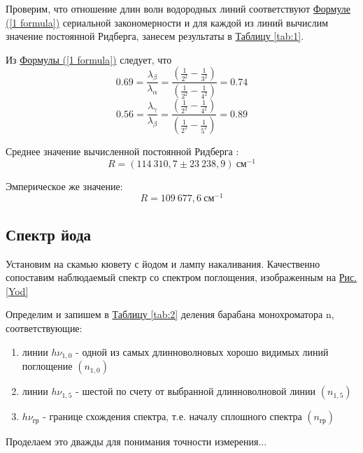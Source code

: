 \documentclass{article}
\begin{document}
Проверим, что отношение длин волн водородных линий соответствуют \hyperref[1 formula]{Формуле (\ref*{1 formula})} сериальной закономерности  и для каждой из линий вычислим значение постоянной Ридберга, занесем результаты в  \hyperref[tab:1]{Таблицу \ref*{tab:1}}.

Из  \hyperref[1 formula]{Формулы (\ref*{1 formula})} следует, что 
\begin{equation*}     
\label{}
0.69 = \frac{\lambda_{\beta}}{\lambda_{\alpha}} =  \frac{\left(\frac{1}{2^2} - \frac{1}{3^2} \right)}{\left(\frac{1}{2^2} - \frac{1}{4^2} \right)} = 0.74
\end{equation*}
\begin{equation*}     
\label{}
0.56 = \frac{\lambda_{\gamma}}{\lambda_{\beta}} =  \frac{\left(\frac{1}{2^2} - \frac{1}{4^2} \right)}{\left(\frac{1}{2^2} - \frac{1}{5^2} \right)} = 0.89
\end{equation*}

 Среднее значение вычисленной постоянной Ридберга :
 \begin{equation}
 \label{R}
     R = (114~310,7 \pm 23~238,9)~ см^{-1}
 \end{equation}

Эмперическое же значение:
  \begin{equation*}
     R = 109 ~677,6~ см^{-1}
 \end{equation*}
\newpage

\subsection{Спектр йода}
Установим на скамью кювету с йодом и лампу накаливания. Качественно сопоставим наблюдаемый спектр со спектром поглощения, изображенным на \hyperref[Yod]{Рис. \ref*{Yod}}

Определим и запишем в  \hyperref[tab:2]{Таблицу \ref*{tab:2}} деления барабана монохроматора n, соответствующие:
\begin{enumerate}
    \item линии $h \nu_{1,0}$ - одной из самых длинноволновых хорошо видимых линий поглощение $(n_{1,0})$
    \item линии $h \nu_{1,5}$ - шестой по счету от выбранной длинноволновой линии  $(n_{1,5})$
    \item $h \nu_{гр}$ - границе схождения спектра, т.е. началу сплошного спектра $(n_{гр})$
\end{enumerate}

Проделаем это дважды для понимания точности измерения...
\end{document}

